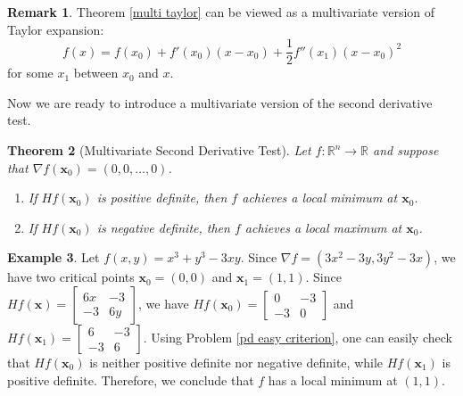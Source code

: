 \documentclass[12pt,letterpaper]{book}
\numberwithin{equation}{section}
\newtheorem{thm}{\textbf{Theorem}}[section]
\theoremstyle{definition}
\newtheorem{example}[thm]{\textbf{Example}}
\newtheorem{remark}[thm]{\textbf{Remark}}
\newcommand{\vx}{\bm{x}}
\begin{document}
\begin{remark}
Theorem \ref{multi taylor} can be viewed as a multivariate version of Taylor expansion:
$$f(x)=f(x_0)+f'(x_0)(x-x_0)+\frac{1}{2}f''(x_1)(x-x_0)^2$$
for some $x_1$ between $x_0$ and $x$.
\end{remark}

Now we are ready to introduce a multivariate version of the second derivative test.

\begin{thm}[Multivariate Second Derivative Test]
Let $f:\mathbb{R}^n\to \mathbb{R}$ and suppose that $\nabla f(\vx_0)=(0,0,\ldots,0)$.
\begin{enumerate}
\item If $Hf(\vx_0)$ is positive definite, then $f$ achieves a local minimum at $\vx_0$.
\item If $Hf(\vx_0)$ is negative definite, then $f$ achieves a local maximum at $\vx_0$.
\end{enumerate}
\end{thm}

\begin{example}
Let $f(x,y)=x^3+y^3-3xy$. Since $\nabla f=(3x^2-3y, 3y^2-3x)$, we have two critical points $\vx_0=(0,0)$ and $\vx_1=(1,1)$. Since
$Hf(\vx)=\left[\begin{array}{cc} 6x & -3 \\ -3 & 6y \end{array}\right]$, we have
$Hf(\vx_0)=\left[\begin{array}{rr} 0 & -3 \\ -3 & 0 \end{array}\right]$ and $Hf(\vx_1)=\left[\begin{array}{rr} 6 & -3 \\ -3 & 6 \end{array}\right]$.
Using Problem \ref{pd easy criterion}, one can easily check that $Hf(\vx_0)$ is neither positive definite nor negative definite, while $Hf(\vx_1)$ is positive definite. Therefore, we conclude that $f$ has a local minimum at $(1,1)$.
\end{example}
\end{document}
